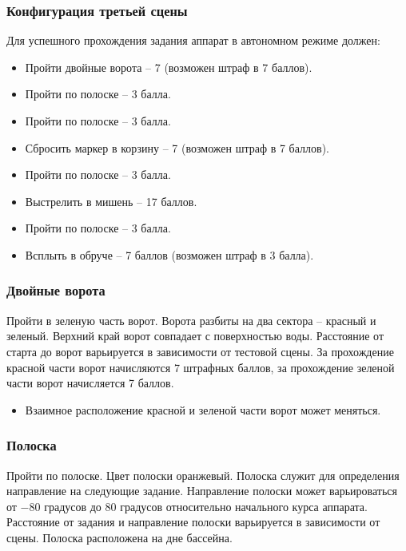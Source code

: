 
\subsubsection*{Конфигурация третьей сцены}


Для успешного прохождения задания аппарат в автономном режиме должен:

\begin{itemize}
    \item Пройти двойные ворота – 7 (возможен штраф в 7 баллов).
    \item Пройти по полоске – 3 балла.
    \item Пройти по полоске – 3 балла.
    \item Сбросить маркер в корзину – 7 (возможен штраф в 7 баллов).
    \item Пройти по полоске – 3 балла.
    \item Выстрелить в мишень – 17 баллов.
    \item Пройти по полоске – 3 балла.
    \item Всплыть в обруче – 7 баллов (возможен штраф в 3 балла).
\end{itemize}

\subsubsection*{Двойные ворота}


Пройти в зеленую часть ворот. Ворота разбиты на два сектора – красный и зеленый. Верхний край ворот совпадает с поверхностью воды. Расстояние от старта до ворот варьируется в зависимости от тестовой сцены. За прохождение красной части ворот начисляются 7 штрафных баллов, за прохождение зеленой части ворот начисляется 7 баллов.

\begin{itemize}
    \item Взаимное расположение красной и зеленой части ворот может меняться. 
\end{itemize}

\subsubsection*{Полоска}


Пройти по полоске. Цвет полоски оранжевый. Полоска служит для определения направление на следующие задание. Направление полоски может варьироваться от   $-80$ градусов до $80$ градусов относительно начального курса аппарата. Расстояние от задания и направление полоски варьируется в зависимости от сцены. Полоска расположена на дне бассейна.

